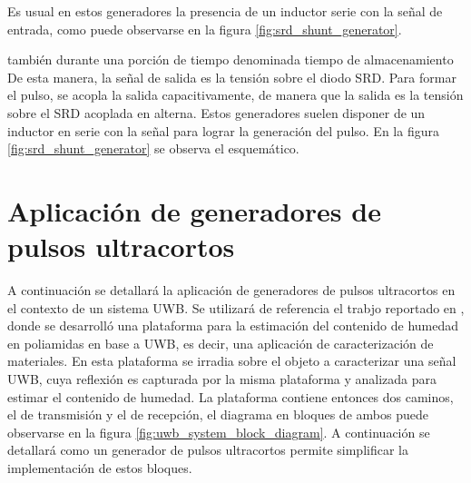 Es usual en estos generadores la presencia de un inductor serie con la señal de
entrada, como puede observarse en la figura \ref{fig:srd_shunt_generator}.

también durante una porción de tiempo denominada tiempo de almacenamiento
De esta manera, la señal de salida es la tensión sobre el diodo SRD.
Para formar el pulso, se acopla la salida capacitivamente, de manera que la
salida es la tensión sobre el SRD acoplada en alterna. 
Estos generadores suelen disponer de un inductor en serie con la señal
para lograr la generación del pulso. En la figura \ref{fig:srd_shunt_generator}
se observa el esquemático.

\section{Aplicación de generadores de pulsos ultracortos}

A continuación se detallará la aplicación de generadores de pulsos ultracortos
en el contexto de un sistema UWB. Se utilizará de referencia el trabjo reportado
en \cite{Altieri2021}, donde se desarrolló una plataforma para la estimación del
contenido de humedad en poliamidas en base a UWB, es decir, una aplicación de
caracterización de materiales. En esta plataforma se irradia sobre el objeto a
caracterizar una señal UWB, cuya reflexión es capturada por la misma plataforma
y analizada para estimar el contenido de humedad. La plataforma contiene
entonces dos caminos, el de transmisión y el de recepción, el diagrama en
bloques de ambos puede observarse en la figura
\ref{fig:uwb_system_block_diagram}. A continuación se detallará como un
generador de pulsos ultracortos permite simplificar la implementación de estos
bloques.

